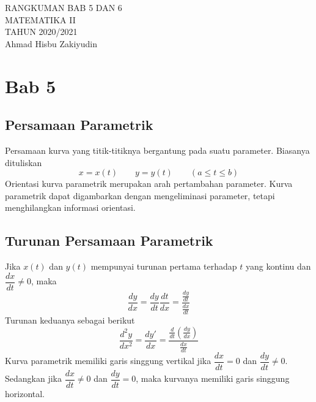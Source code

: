 \documentclass{article}
\begin{document}
 \begin{titlepage}
    \vspace*{\fill}
    \begin{center}
      \Huge {RANGKUMAN BAB 5 DAN 6 \\ MATEMATIKA II \\ TAHUN 2020/2021}\\[0.4 cm]
      \huge {Ahmad Hisbu Zakiyudin}
    \end{center}
    \vspace*{\fill}
  \end{titlepage}
\makeatletter
\renewcommand*\env@matrix[1][*\c@MaxMatrixCols c]{%
  \hskip -\arraycolsep
  \let\@ifnextchar\new@ifnextchar
  \array{#1}}
\makeatother
\newcount\arrowcount
\newcommand\arrows[1]{
        \global\arrowcount#1
        \ifnum\arrowcount>0
                \begin{matrix}[c]
                \expandafter\nextarrow
        \fi
}

\newcommand\nextarrow[1]{
        \global\advance\arrowcount-1
        \ifx\relax#1\relax\else \xrightarrow{#1}\fi
        \ifnum\arrowcount=0
                \end{matrix}
        \else
                \\
                \expandafter\nextarrow
        \fi
}
\newpage
{}
\section{Bab 5}
\subsection{Persamaan Parametrik}
Persamaan kurva yang titik-titiknya bergantung pada suatu parameter. Biasanya dituliskan
$$ x=x(t) \qquad y=y(t) \qquad (a\leq t\leq b)$$
Orientasi kurva parametrik merupakan arah pertambahan parameter.
Kurva parametrik dapat digambarkan dengan mengeliminasi parameter, tetapi menghilangkan informasi orientasi.
\subsection{Turunan Persamaan Parametrik}
Jika $x(t)$ dan $y(t)$ mempunyai turunan pertama terhadap $t$ yang kontinu dan $\dfrac{dx}{dt}\neq 0$, maka
$$ \dfrac{dy}{dx} = \dfrac{dy}{dt}\dfrac{dt}{dx} = \dfrac{\frac{dy}{dt}}{\frac{dx}{dt}} $$
Turunan keduanya sebagai berikut
$$ \dfrac{d^2y}{dx^2} = \dfrac{dy'}{dx} = \dfrac{\frac{d}{dt}\left(\frac{dy}{dx}\right)}{\frac{dx}{dt}} $$
Kurva parametrik memiliki garis singgung vertikal jika $\dfrac{dx}{dt}=0$ dan $\dfrac{dy}{dt}\neq 0$. Sedangkan jika $\dfrac{dx}{dt}\neq 0$ dan $\dfrac{dy}{dt}=0$, maka kurvanya memiliki garis singgung horizontal.
\end{document}

